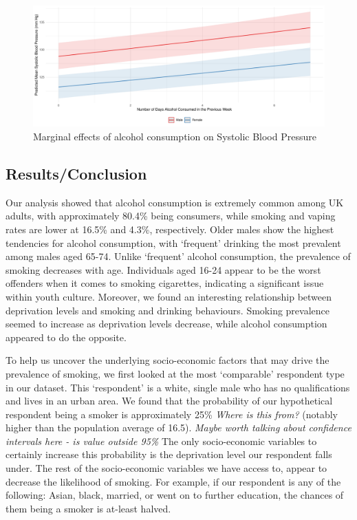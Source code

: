 \documentclass[
  11pt,
  twocolumn]{article}
\begin{document}
\begin{figure}[H]
\includegraphics{Coursework_files/figure-latex/output-effect-plots-alc-1} \caption{Marginal effects of alcohol consumption on Systolic Blood Pressure}\label{fig:output-effect-plots-alc}
\end{figure}

\hypertarget{resultsconclusion}{%
\subsection{Results/Conclusion}\label{resultsconclusion}}

Our analysis showed that alcohol consumption is extremely common among
UK adults, with approximately 80.4\% being consumers, while smoking and
vaping rates are lower at 16.5\% and 4.3\%, respectively. Older males
show the highest tendencies for alcohol consumption, with `frequent'
drinking the most prevalent among males aged 65-74. Unlike `frequent'
alcohol consumption, the prevalence of smoking decreases with age.
Individuals aged 16-24 appear to be the worst offenders when it comes to
smoking cigarettes, indicating a significant issue within youth culture.
Moreover, we found an interesting relationship between deprivation
levels and smoking and drinking behaviours. Smoking prevalence seemed to
increase as deprivation levels decrease, while alcohol consumption
appeared to do the opposite.

To help us uncover the underlying socio-economic factors that may drive
the prevalence of smoking, we first looked at the most `comparable'
respondent type in our dataset. This `respondent' is a white, single
male who has no qualifications and lives in an urban area. We found that
the probability of our hypothetical respondent being a smoker is
approximately 25\% \emph{Where is this from?} (notably higher than the
population average of 16.5). \emph{Maybe worth talking about confidence
intervals here - is value outside 95\%} The only socio-economic
variables to certainly increase this probability is the deprivation
level our respondent falls under. The rest of the socio-economic
variables we have access to, appear to decrease the likelihood of
smoking. For example, if our respondent is any of the following: Asian,
black, married, or went on to further education, the chances of them
being a smoker is at-least halved.
\end{document}
